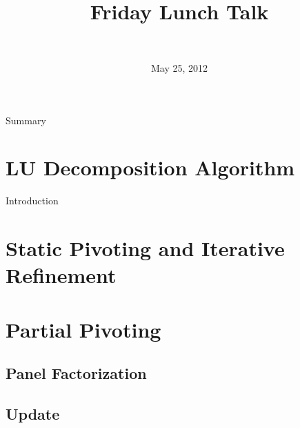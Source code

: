 \documentclass{beamer}
\title[LU decomposition on DaGUE]{
        {\bfseries \projet\\} 
        {\bfseries \huge \sujet}
        {\small Friday Lunch Talk}
}
\date{May 25, 2012}
\author[Zenati]{
  {\normalsize \bfseries \sffamily} {\large \gA}\\
}
\begin{document}
        
\begin{frame}
\maketitle
\end{frame}

\begin{frame}{Summary}
\tableofcontents
\end{frame}


\section{LU Decomposition Algorithm}
\begin{frame}{Introduction}

\end{frame}

\section{Static Pivoting and Iterative Refinement}
\begin{frame}{}
\end{frame}

\section{Partial Pivoting}
\begin{frame}{}
\end{frame}

\subsection{Panel Factorization}
\begin{frame}{}
\end{frame}

\subsection{Update}

\begin{frame}{}
\end{frame}
\end{document}
